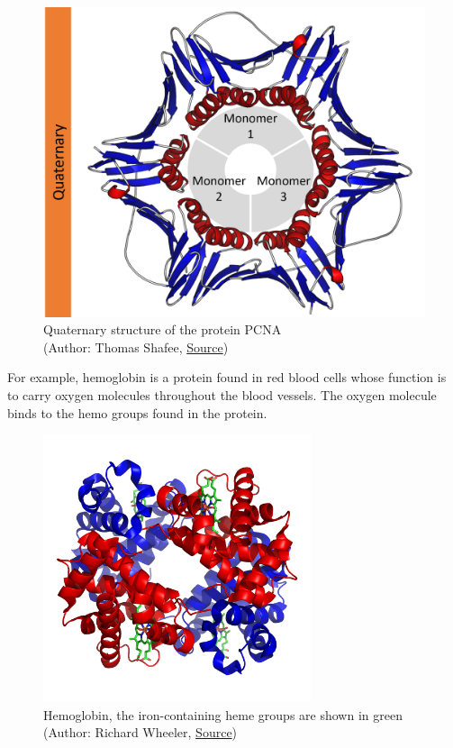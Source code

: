 \begin{figure}[H]
    \centering
    \includegraphics[width=\textwidth]{figures/bioinformatics/protein_structure_quaternary.png}
    \caption{Quaternary structure of the protein PCNA\\(Author: Thomas Shafee, \href{https://en.wikipedia.org/wiki/File:Protein\_structure\_(full).png}{Source})}
\end{figure}

For example, hemoglobin is a protein found in red blood cells whose function is to carry oxygen molecules throughout the blood vessels. The oxygen molecule binds to the hemo groups found in the protein.

\begin{figure}[H]
    \centering
    \includegraphics[width=0.7\textwidth]{figures/bioinformatics/hemoglobin.png}
    \caption{Hemoglobin, the iron-containing heme groups are shown in green \\(Author: Richard Wheeler, \href{https://en.wikipedia.org/wiki/File:1GZX\_Haemoglobin.png}{Source})}
\end{figure}

